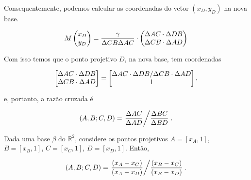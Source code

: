 \begin{sol}
Consequentemente, podemos calcular as coordenadas do vetor \((x_D, y_D)\) na nova base.

\begin{equation}
	 M \begin{pmatrix} x_D \\ y_D \\  \end{pmatrix} =  \frac{\gamma}{\Delta CB \Delta AC} \cdot \begin{pmatrix} \Delta AC \cdot \Delta DB \\ \Delta CB \cdot \Delta AD \\  \end{pmatrix}
\end{equation}


Com isso temos que o ponto projetivo $D$, na nova base, tem coordenadas

\begin{equation}
	 \begin{bmatrix} \Delta AC \cdot \Delta DB \\ \Delta CB \cdot \Delta AD \\  \end{bmatrix} = \begin{bmatrix} \Delta AC \cdot \Delta DB / \Delta CB \cdot \Delta AD \\ 1 \\  \end{bmatrix},
\end{equation}

e, portanto, a razão cruzada é

\begin{equation}
	 (A, B; C, D) = \left. \frac{\Delta AC}{\Delta AD} \middle/ \frac{\Delta BC}{\Delta BD}\right..
\end{equation}

\end{sol}

\begin{cor}
Dada uma base \(\beta\) do \(\mathbb{R}^2\), considere os pontos projetivos $A = [x_A,1]$, $B = [x_B,1]$, $C = [x_C,1]$, $D = [x_D,1]$.
Então,

\begin{equation}
	 (A, B; C, D) = \left. \frac{(x_A - x_C)}{(x_A - x_D)} \middle/ \frac{(x_B - x_C)}{(x_B - x_D)}\right..
\end{equation}

\end{cor}

